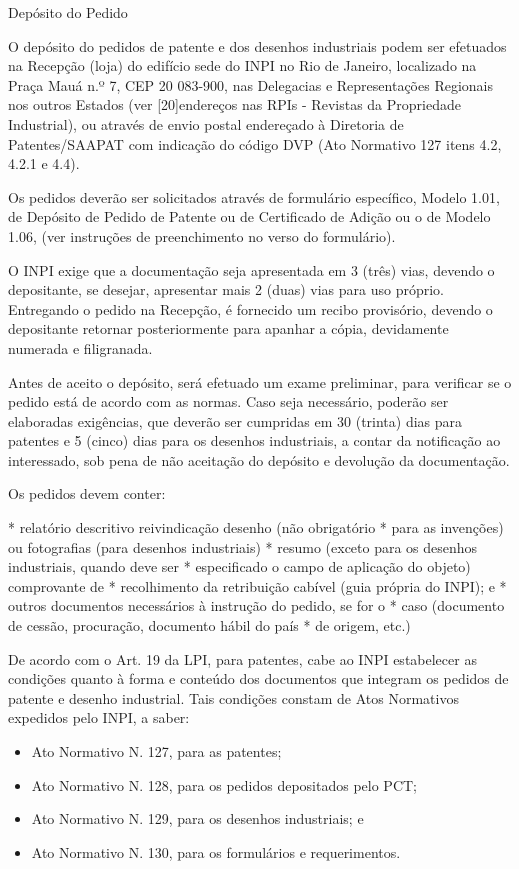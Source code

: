 \documentclass[12pt]{article}
\begin{document}
Depósito do Pedido

O depósito do pedidos de patente e dos desenhos industriais podem ser
efetuados na Recepção (loja) do edifício sede do INPI no Rio de
Janeiro, localizado na Praça Mauá n.º 7, CEP 20 083-900, nas
Delegacias e Representações Regionais nos outros Estados (ver
[20]endereços nas RPIs - Revistas da Propriedade Industrial), ou
através de envio postal endereçado à Diretoria de Patentes/SAAPAT com
indicação do código DVP (Ato Normativo 127 itens 4.2, 4.2.1 e 4.4).

Os pedidos deverão ser solicitados através de formulário específico,
Modelo 1.01, de Depósito de Pedido de Patente ou de Certificado de
Adição ou o de Modelo 1.06, (ver instruções de preenchimento no verso
do formulário).

O INPI exige que a documentação seja apresentada em 3 (três) vias,
devendo o depositante, se desejar, apresentar mais 2 (duas) vias para
uso próprio. Entregando o pedido na Recepção, é fornecido um recibo
provisório, devendo o depositante retornar posteriormente para apanhar
a cópia, devidamente numerada e filigranada.

Antes de aceito o depósito, será efetuado um exame preliminar, para
verificar se o pedido está de acordo com as normas. Caso seja
necessário, poderão ser elaboradas exigências, que deverão ser
cumpridas em 30 (trinta) dias para patentes e 5 (cinco) dias para os
desenhos industriais, a contar da notificação ao interessado, sob pena
de não aceitação do depósito e devolução da documentação.

Os pedidos devem conter:

     * relatório descritivo reivindicação desenho (não obrigatório
     * para as invenções) ou fotografias (para desenhos industriais)
     * resumo (exceto para os desenhos industriais, quando deve ser
     * especificado o campo de aplicação do objeto) comprovante de
     * recolhimento da retribuição cabível (guia própria do INPI); e
     * outros documentos necessários à instrução do pedido, se for o
     * caso (documento de cessão, procuração, documento hábil do país
     * de origem, etc.)
     
     De acordo com o Art. 19 da LPI, para patentes, cabe ao INPI
     estabelecer as condições quanto à forma e conteúdo dos documentos
     que integram os pedidos de patente e desenho industrial. Tais
     condições constam de Atos Normativos expedidos pelo INPI, a
     saber:

    \begin{itemize}
     \item Ato Normativo N. 127, para as patentes;
     \item Ato Normativo N. 128, para os pedidos depositados pelo PCT;
     \item Ato Normativo N. 129, para os desenhos industriais; e
     \item Ato Normativo N. 130, para os formulários e requerimentos.
    \end{itemize}
    
\end{document}
